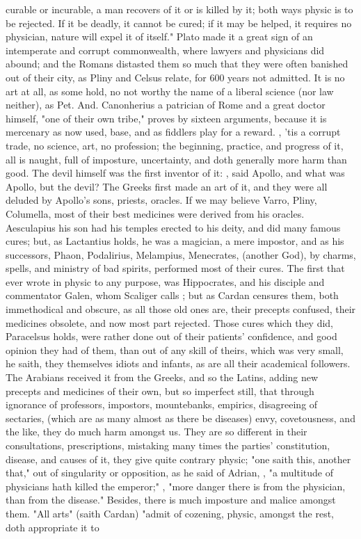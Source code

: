 {curable or incurable, a man recovers of it or is killed by it; both ways physic is to be rejected. If it be deadly, it cannot be cured; if it may be helped, it requires no physician, nature will expel it of itself." Plato made it a great sign of an intemperate and corrupt commonwealth, where lawyers and physicians did abound; and the Romans distasted them so much that they were often banished out of their city, as Pliny and Celsus relate, for 600 years not admitted. It is no art at all, as some hold, no not worthy the name of a liberal science (nor law neither), as Pet. And. Canonherius a patrician of Rome and a great doctor himself, "one of their own tribe," proves by sixteen arguments, because it is mercenary as now used, base, and as fiddlers play for a reward. , 'tis a corrupt trade, no science, art, no profession; the beginning, practice, and progress of it, all is naught, full of imposture, uncertainty, and doth generally more harm than good. The devil himself was the first inventor of it: , said Apollo, and what was Apollo, but the devil? The Greeks first made an art of it, and they were all deluded by Apollo's sons, priests, oracles. If we may believe Varro, Pliny, Columella, most of their best medicines were derived from his oracles. Aesculapius his son had his temples erected to his deity, and did many famous cures; but, as Lactantius holds, he was a magician, a mere impostor, and as his successors, Phaon, Podalirius, Melampius, Menecrates, (another God), by charms, spells, and ministry of bad spirits, performed most of their cures. The first that ever wrote in physic to any purpose, was Hippocrates, and his disciple and commentator Galen, whom Scaliger calls ; but as Cardan censures them, both immethodical and obscure, as all those old ones are, their precepts confused, their medicines obsolete, and now most part rejected. Those cures which they did, Paracelsus holds, were rather done out of their patients' confidence, and good opinion they had of them, than out of any skill of theirs, which was very small, he saith, they themselves idiots and infants, as are all their academical followers. The Arabians received it from the Greeks, and so the Latins, adding new precepts and medicines of their own, but so imperfect still, that through ignorance of professors, impostors, mountebanks, empirics, disagreeing of sectaries, (which are as many almost as there be diseases) envy, covetousness, and the like, they do much harm amongst us. They are so different in their consultations, prescriptions, mistaking many times the parties' constitution, disease, and causes of it, they give quite contrary physic; "one saith this, another that," out of singularity or opposition, as he said of Adrian, , "a multitude of physicians hath killed the emperor;" , "more danger there is from the physician, than from the disease." Besides, there is much imposture and malice amongst them. "All arts" (saith Cardan) "admit of cozening, physic, amongst the rest, doth appropriate it to }
